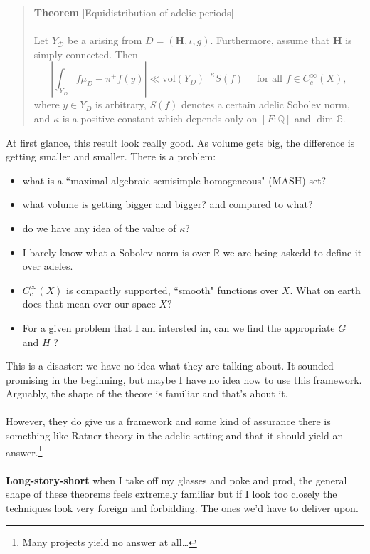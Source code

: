 \documentclass[12pt]{article}
\begin{document}
\begin{quotation}\noindent \textbf{Theorem} [Equidistribution of adelic periods] \\\\
Let $Y_\mathcal{D}$ be a \textbf{\color{blue}{maximal algebraic semisimple homogeneous set}}
arising from $D=(\mathbf{H},\iota,g)$.
Furthermore, assume that $\mathbf{H}$ is simply connected.
Then
$$\left| \int_{Y_D}
 f \mu_D- \pi^+ f(y)\right| \ll  \mathrm{vol}(Y_D)^{-\kappa}
S(f)\quad\text{ for all } f \in C^{\infty}_c(X),$$
where $y\in Y_D$ is arbitrary, $S( f)$ denotes a certain adelic Sobolev norm,
and $\kappa$ is a positive constant which depends only on $[F:\mathbb{Q}]$ and 
$\dim \mathbb{G}$.\end{quotation}
At first glance, this result look really good.  As volume gets big, the difference is getting smaller and smaller.  There is a problem:
\begin{itemize}
\item what is a ``maximal algebraic semisimple homogeneous" (MASH) set?
\item what volume is getting bigger and bigger?  and compared to what?
\item do we have any idea of the value of $\kappa$? 
\item I barely know what a Sobolev norm is over $\mathbb{R}$ we are being askedd to define it over adeles.
\item $C_c^\infty(X)$ is compactly supported, ``smooth" functions over $X$.  What on earth does that mean over our space $X$?
\item For a given problem that I am intersted in, can we find the appropriate $G$ and $H$ ?
\end{itemize}
This is a disaster: we have no idea what they are talking about.  It sounded promising in the beginning, but maybe I have no idea how to use this framework.  Arguably, the shape of the theore is familiar and that's about it. \\ \\
However, they do give us a framework and some kind of assurance there is something like Ratner theory in the adelic setting and that it should yield an answer.\footnote{Many projects yield no answer at all\dots} \\ \\
\textbf{Long-story-short} when I take off my glasses and poke and prod, the general shape of these theorems feels extremely familiar but if I look too closely the techniques look very foreign and forbidding.  The ones we'd have to deliver upon.
\end{document}
